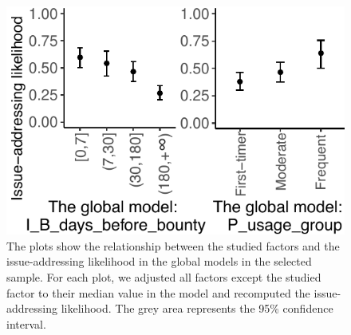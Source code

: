 \begin{figure}[t]
\centering\includegraphics[width=0.7\columnwidth ]{pics/rq3/rq3_trend_global}
\caption{The plots show the relationship between the studied factors and the issue-addressing likelihood in the global models in the selected sample. For each plot, we adjusted all factors except the studied factor to their median value in the model and recomputed the issue-addressing likelihood. The grey area represents the 95\% confidence interval.}
\vspace{-0.1in}
\label{fig:rq3_trend_global}
\end{figure}


